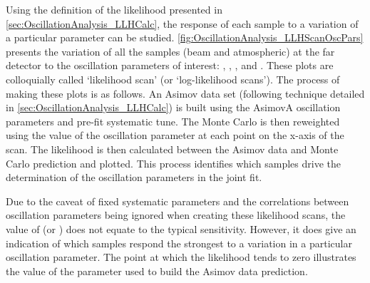 Using the definition of the likelihood presented in \autoref{sec:OscillationAnalysis_LLHCalc}, the response of each sample to a variation of a particular parameter can be studied. 
\autoref{fig:OscillationAnalysis_LLHScanOscPars} presents the variation of all the samples (beam and atmospheric) at the far detector to the oscillation parameters of interest: , , , and . These plots are colloquially called `likelihood scan' (or `log-likelihood scans'). The process of making these plots is as follows. An Asimov data set (following technique detailed in \autoref{sec:OscillationAnalysis_LLHCalc}) is built using the AsimovA oscillation parameters and pre-fit systematic tune. The Monte Carlo is then reweighted using the value of the oscillation parameter at each point on the x-axis of the scan. The likelihood is then calculated between the Asimov data and Monte Carlo prediction and plotted. This process identifies which samples drive the determination of the oscillation parameters in the joint fit.

Due to the caveat of fixed systematic parameters and the correlations between oscillation parameters being ignored when creating these likelihood scans, the value of  (or ) does not equate to the typical \quickmath{1\sigma} sensitivity. However, it does give an indication of which samples respond the strongest to a variation in a particular oscillation parameter. The point at which the likelihood tends to zero illustrates the value of the parameter used to build the Asimov data prediction.

